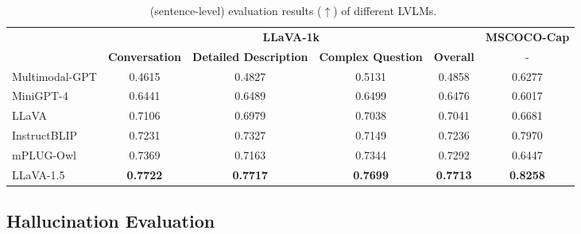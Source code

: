 \begin{table}[t]
    \centering \small
    \begin{tabular}{lccccc} \toprule
    \bf  &  \multicolumn{4}{c}{\bf LLaVA-1k}  & \bf MSCOCO-Cap\\
\bf         & \bf Conversation&\bf Detailed Description &\bf Complex Question &\bf Overall & -\\ \midrule
         Multimodal-GPT& 0.4615&0.4827&0.5131&0.4858 & 0.6277\\
         MiniGPT-4 & 0.6441& 0.6489 & 0.6499 & 0.6476 &0.6017\\
                           LLaVA & 0.7106 & 0.6979&0.7038& 0.7041 & 0.6681\\
                           InstructBLIP & 0.7231 & 0.7327 & 0.7149& 0.7236 & {0.7970}\\
                  mPLUG-Owl & 0.7369& 0.7163& 0.7344& 0.7292 & 0.6447\\ 


        LLaVA-1.5 &\bf 0.7722 &\bf 0.7717&\bf 0.7699&\bf 0.7713 &\bf 0.8258\\

        \bottomrule
    \end{tabular}
    \caption{\ours\ (sentence-level) evaluation results ($\uparrow$) of different LVLMs.
    }
    \label{tab:sentence1}
\end{table}








\subsection{Hallucination Evaluation}


